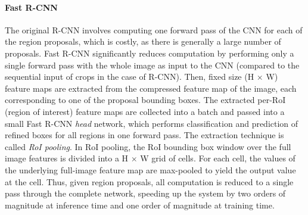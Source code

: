 \paragraph{Fast R-CNN}
The original R-CNN involves computing one forward pass of the CNN for each of the region proposals,
which is costly, as there is generally a large number of proposals.
Fast R-CNN \cite{FastRCNN} significantly reduces computation by performing only a single forward pass with the whole image
as input to the CNN (compared to the sequential input of crops in the case of R-CNN).
Then, fixed size (H $\times$ W) feature maps are extracted from the compressed feature map of the image,
each corresponding to one of the proposal bounding boxes.
The extracted per-RoI (region of interest) feature maps are collected into a batch and passed into a small Fast R-CNN
\emph{head} network, which performs classification and prediction of refined boxes for all regions in one forward pass.
The extraction technique is called \emph{RoI pooling}. In RoI pooling, the RoI bounding box window over the full image features
is divided into a H $\times$ W grid of cells. For each cell, the values of the underlying
full-image feature map are max-pooled to yield the output value at the cell.
Thus, given region proposals, all computation is reduced to a single pass through the complete network,
speeding up the system by two orders of magnitude at inference time and one order of magnitude
at training time.

